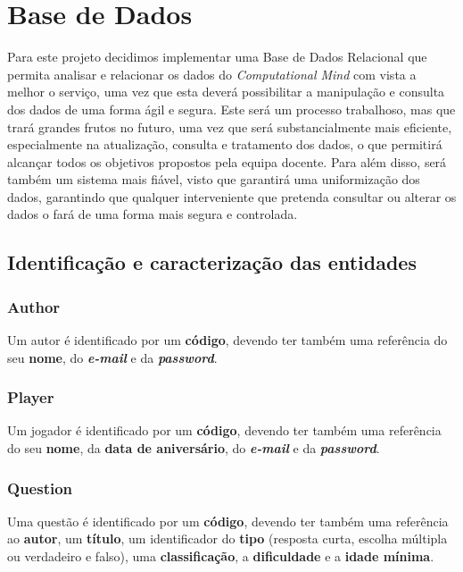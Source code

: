 \documentclass[11pt,a4paper]{report}
\begin{document}
\chapter{Base de Dados}

Para este projeto decidimos implementar uma Base de Dados Relacional que permita analisar e relacionar os dados do \emph{Computational Mind} com vista a melhor o serviço, uma vez que esta deverá possibilitar a manipulação e consulta dos dados de uma forma ágil e segura. 
Este será um processo trabalhoso, mas que trará grandes frutos no futuro, uma vez que será substancialmente mais eficiente, especialmente na atualização, consulta e tratamento dos dados, o que permitirá alcançar todos os objetivos propostos pela equipa docente. Para além disso, será também um sistema mais fiável, visto que garantirá uma uniformização dos dados, garantindo que qualquer interveniente que pretenda consultar ou alterar os dados o fará de uma forma mais segura e controlada.

\section{Identificação e caracterização das entidades}

\subsection{Author}
Um autor é identificado por um \textbf{código}, devendo ter também uma referência do seu \textbf{nome}, do \textbf{\emph{e-mail}} e da \textbf{\emph{password}}.

\subsection{Player}
Um jogador é identificado por um \textbf{código}, devendo ter também uma referência do seu \textbf{nome}, da \textbf{data de aniversário}, do \textbf{\emph{e-mail}} e da \textbf{\emph{password}}.

\subsection{Question}
Uma questão é identificado por um \textbf{código}, devendo ter também uma referência ao \textbf{autor}, um \textbf{título}, um identificador do \textbf{tipo} (resposta curta, escolha múltipla ou verdadeiro e falso), uma \textbf{classificação}, a \textbf{dificuldade} e a \textbf{idade mínima}.
\end{document}
